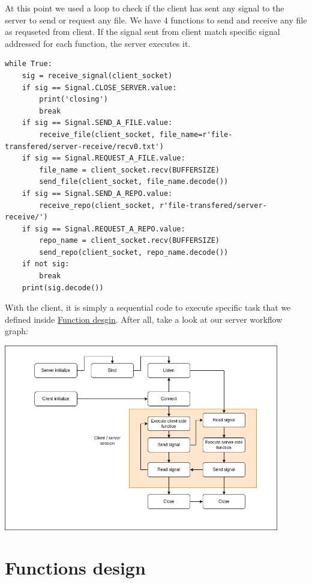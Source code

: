 \documentclass{article}
\begin{document}
At this point we used a loop to check if the client has sent any signal to the server to send or request any file. We have 4 functions to send and receive any file as requseted from client.
If the signal sent from client match specific signal addressed for each function, the server executes it. \pagebreak
\begin{lstlisting}[frame=single]
  while True:
    sig = receive_signal(client_socket)
    if sig == Signal.CLOSE_SERVER.value:
        print('closing')
        break
    if sig == Signal.SEND_A_FILE.value:
        receive_file(client_socket, file_name=r'file-transfered/server-receive/recv0.txt')
    if sig == Signal.REQUEST_A_FILE.value:
        file_name = client_socket.recv(BUFFERSIZE)
        send_file(client_socket, file_name.decode())
    if sig == Signal.SEND_A_REPO.value:
        receive_repo(client_socket, r'file-transfered/server-receive/')
    if sig == Signal.REQUEST_A_REPO.value:
        repo_name = client_socket.recv(BUFFERSIZE)
        send_repo(client_socket, repo_name.decode())
    if not sig:
        break
    print(sig.decode())
\end{lstlisting}
With the client, it is simply a sequential code to execute specific task that we defined inside \hyperref[functions]{Function desgin}.
After all, take a look at our server workflow graph:\\
\begin{center}
  \hspace{20pt}\includegraphics[width=0.9\textwidth]{TCP_server.png} 
\end{center}

\section*{Functions design}\label{functions}
\end{document}

